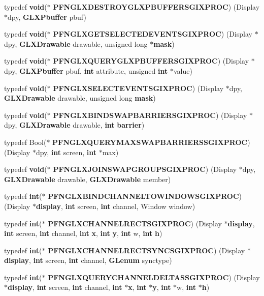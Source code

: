 \begin{DoxyCompactItemize}
\item 
typedef {\bf void}($\ast$ {\bf P\+F\+N\+G\+L\+X\+D\+E\+S\+T\+R\+O\+Y\+G\+L\+X\+P\+B\+U\+F\+F\+E\+R\+S\+G\+I\+X\+P\+R\+OC}) (Display $\ast$dpy, {\bf G\+L\+X\+Pbuffer} pbuf)
\item 
typedef {\bf void}($\ast$ {\bf P\+F\+N\+G\+L\+X\+G\+E\+T\+S\+E\+L\+E\+C\+T\+E\+D\+E\+V\+E\+N\+T\+S\+G\+I\+X\+P\+R\+OC}) (Display $\ast$dpy, {\bf G\+L\+X\+Drawable} drawable, unsigned long $\ast${\bf mask})
\item 
typedef {\bf void}($\ast$ {\bf P\+F\+N\+G\+L\+X\+Q\+U\+E\+R\+Y\+G\+L\+X\+P\+B\+U\+F\+F\+E\+R\+S\+G\+I\+X\+P\+R\+OC}) (Display $\ast$dpy, {\bf G\+L\+X\+Pbuffer} pbuf, {\bf int} attribute, unsigned {\bf int} $\ast$value)
\item 
typedef {\bf void}($\ast$ {\bf P\+F\+N\+G\+L\+X\+S\+E\+L\+E\+C\+T\+E\+V\+E\+N\+T\+S\+G\+I\+X\+P\+R\+OC}) (Display $\ast$dpy, {\bf G\+L\+X\+Drawable} drawable, unsigned long {\bf mask})
\item 
typedef {\bf void}($\ast$ {\bf P\+F\+N\+G\+L\+X\+B\+I\+N\+D\+S\+W\+A\+P\+B\+A\+R\+R\+I\+E\+R\+S\+G\+I\+X\+P\+R\+OC}) (Display $\ast$dpy, {\bf G\+L\+X\+Drawable} drawable, {\bf int} {\bf barrier})
\item 
typedef Bool($\ast$ {\bf P\+F\+N\+G\+L\+X\+Q\+U\+E\+R\+Y\+M\+A\+X\+S\+W\+A\+P\+B\+A\+R\+R\+I\+E\+R\+S\+S\+G\+I\+X\+P\+R\+OC}) (Display $\ast$dpy, {\bf int} screen, {\bf int} $\ast$max)
\item 
typedef {\bf void}($\ast$ {\bf P\+F\+N\+G\+L\+X\+J\+O\+I\+N\+S\+W\+A\+P\+G\+R\+O\+U\+P\+S\+G\+I\+X\+P\+R\+OC}) (Display $\ast$dpy, {\bf G\+L\+X\+Drawable} drawable, {\bf G\+L\+X\+Drawable} member)
\item 
typedef {\bf int}($\ast$ {\bf P\+F\+N\+G\+L\+X\+B\+I\+N\+D\+C\+H\+A\+N\+N\+E\+L\+T\+O\+W\+I\+N\+D\+O\+W\+S\+G\+I\+X\+P\+R\+OC}) (Display $\ast${\bf display}, {\bf int} screen, {\bf int} channel, Window window)
\item 
typedef {\bf int}($\ast$ {\bf P\+F\+N\+G\+L\+X\+C\+H\+A\+N\+N\+E\+L\+R\+E\+C\+T\+S\+G\+I\+X\+P\+R\+OC}) (Display $\ast${\bf display}, {\bf int} screen, {\bf int} channel, {\bf int} {\bf x}, {\bf int} {\bf y}, {\bf int} w, {\bf int} {\bf h})
\item 
typedef {\bf int}($\ast$ {\bf P\+F\+N\+G\+L\+X\+C\+H\+A\+N\+N\+E\+L\+R\+E\+C\+T\+S\+Y\+N\+C\+S\+G\+I\+X\+P\+R\+OC}) (Display $\ast${\bf display}, {\bf int} screen, {\bf int} channel, {\bf G\+Lenum} synctype)
\item 
typedef {\bf int}($\ast$ {\bf P\+F\+N\+G\+L\+X\+Q\+U\+E\+R\+Y\+C\+H\+A\+N\+N\+E\+L\+D\+E\+L\+T\+A\+S\+S\+G\+I\+X\+P\+R\+OC}) (Display $\ast${\bf display}, {\bf int} screen, {\bf int} channel, {\bf int} $\ast${\bf x}, {\bf int} $\ast${\bf y}, {\bf int} $\ast$w, {\bf int} $\ast${\bf h})

\end{DoxyCompactItemize}
